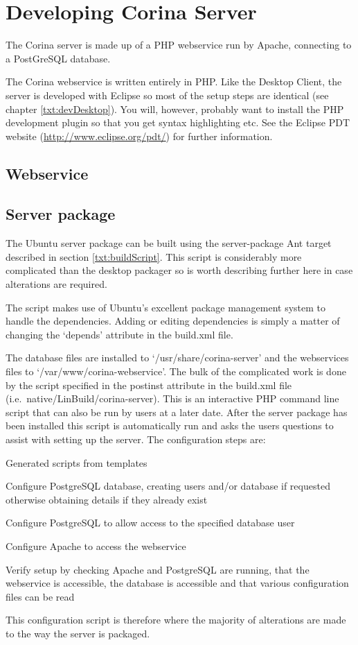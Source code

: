 \chapter{Developing Corina Server}

The Corina server is made up of a PHP webservice run by Apache, connecting to a PostGreSQL database.  

The Corina webservice is written entirely in PHP.  Like the Desktop Client, the server is developed with Eclipse so most of the setup steps are identical (see chapter \ref{txt:devDesktop}).  You will, however, probably want to install the PHP development plugin so that you get syntax highlighting etc.  See the Eclipse PDT website (\url{http://www.eclipse.org/pdt/}) for further information.


\section{Webservice }

\section{Server package}
\label{txt:serverPackage}
The Ubuntu server package can be built using the server-package Ant target described in section \ref{txt:buildScript}.  This script is considerably more complicated than the desktop packager so is worth describing further here in case alterations are required.

The script makes use of Ubuntu's excellent package management system to handle the dependencies.  Adding or editing dependencies is simply a matter of changing the `depends' attribute in the build.xml file.  

The database files are installed to `/usr/share/corina-server' and the webservices files to `/var/www/corina-webservice'.  The bulk of the complicated work is done by the script specified in the postinst attribute in the build.xml file (i.e.\ native/LinBuild/corina-server).  This is an interactive PHP command line script that can also be run by users at a later date.  After the server package has been installed this script is automatically run and asks the users questions to assist with setting up the server.  The configuration steps are:

\begin{itemize*}
 \item Generated scripts from templates
 \item Configure PostgreSQL database, creating users and/or database if requested otherwise obtaining details if they already exist
 \item Configure PostgreSQL to allow access to the specified database user
 \item Configure Apache to access the webservice
 \item Verify setup by checking Apache and PostgreSQL are running, that the webservice is accessible, the database is accessible and that various configuration files can be read
\end{itemize*}

This configuration script is therefore where the majority of alterations are made to the way the server is packaged.  

